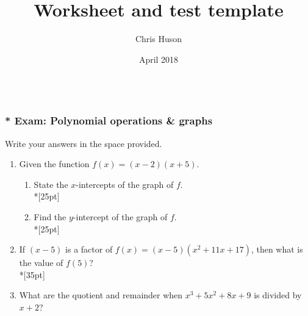 \documentclass[12pt, oneside]{article}
\title{Worksheet and test template}
\author{Chris Huson}
\date{April 2018}
\begin{document}
\subsubsection*{\\* Exam: Polynomial operations \& graphs}
Write your answers in the space provided.

\begin{enumerate}

\item Given the function $f(x)=(x-2)(x+5)$. 
\begin{enumerate}
    \item State the $x$-intercepts of the graph of $f$. \\*[25pt]
    \item Find the $y$-intercept of the graph of $f$.\\*[25pt]
\end{enumerate}


\item If $(x-5)$ is a factor of $f(x)=(x-5)(x^2+11x+17)$, then what is the value of $f(5)$?\\*[35pt]

\item What are the quotient and remainder when $x^3+5x^2+8x+9$ is divided by $x+2$?


\end{enumerate}
\end{document}
